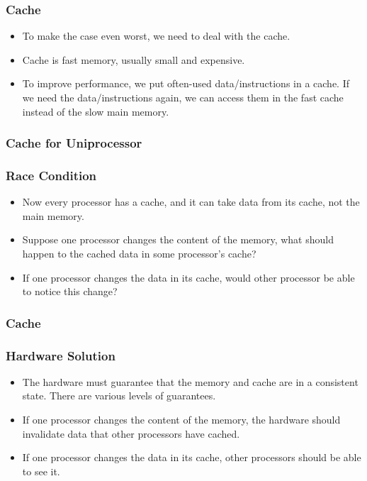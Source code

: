 \documentclass{beamer}
\begin{document}
\begin{CJK}{UTF8}{bsmi}
\begin{frame}
\frametitle{Cache}
\begin{itemize}
\item To make the case even worst, we need to deal with the cache.
\item Cache is fast memory, usually small and expensive.
\item To improve performance, we put often-used data/instructions in a  cache. 
If we need the data/instructions again, we can access them in the fast cache instead of the slow main memory.
\end{itemize}
\end{frame}

\begin{frame}
\frametitle{Cache for Uniprocessor}
\centerline{}
\end{frame}

\begin{frame}
\frametitle{Race Condition}
\begin{itemize}
\item Now every processor has a cache, and it can take data from its
  cache, not the main memory.
\item Suppose one processor changes the content of the memory, what
  should happen to the cached data in some processor's cache?
\item If one processor changes the data in its cache, would other
  processor be able to notice this change?
\end{itemize}
\end{frame}

\begin{frame}
\frametitle{Cache}
\centerline{}
\end{frame}

\begin{frame}
\frametitle{Hardware Solution}
\begin{itemize}
\item The hardware must guarantee that the memory and cache are in a consistent state. There are various levels of guarantees.
\item If one processor changes the content of the memory, the hardware should invalidate data that other processors have cached.
\item If one processor changes the data in its cache, other processors should be able to see it.
\end{itemize}
\end{frame}


\end{CJK}
\end{document}

